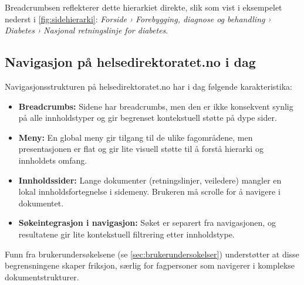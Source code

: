 Breadcrumbsen reflekterer dette hierarkiet direkte, slik som vist i
eksempelet nederst i \autoref{fig:sidehierarki}:
\textit{Forside › Forebygging, diagnose og behandling › Diabetes ›
Nasjonal retningslinje for diabetes}.

\subsection{Navigasjon på helsedirektoratet.no i dag}
\label{sec:nav-i-dag}



Navigasjonsstrukturen på helsedirektoratet.no har i dag følgende
karakteristika:

\begin{itemize}
    \item \textbf{Breadcrumbs:} Sidene har breadcrumbs, men den er ikke
          konsekvent synlig på alle innholdstyper og gir begrenset
          kontekstuell støtte på dype sider.
    \item \textbf{Meny:} En global meny gir tilgang til de ulike
          fagområdene, men presentasjonen er flat og gir lite visuell
          støtte til å forstå hierarki og innholdets omfang.
    \item \textbf{Innholdssider:} Lange dokumenter (retningslinjer,
          veiledere) mangler en lokal innholdsfortegnelse i sidemeny.
          Brukeren må scrolle for å navigere i dokumentet.
    \item \textbf{Søkeintegrasjon i navigasjon:} Søket er separert fra
          navigasjonen, og resultatene gir lite kontekstuell filtrering
          etter innholdstype.
\end{itemize}

Funn fra brukerundersøkelsene (se \autoref{sec:brukerundersokelser})
understøtter at disse begrensningene skaper friksjon, særlig for
fagpersoner som navigerer i komplekse dokumentstrukturer.


